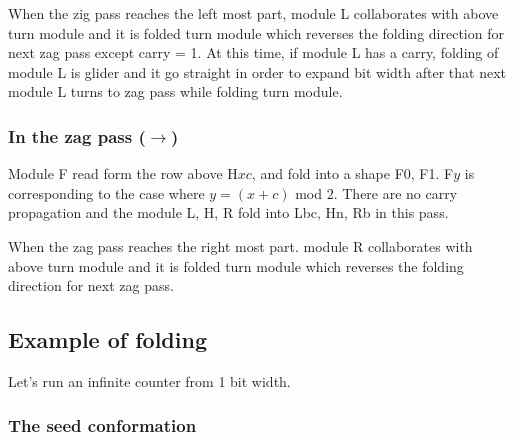 \documentclass[runningheads]{llncs}
\begin{document}
When the zig pass reaches the left most part, module L collaborates with above turn module and it is folded turn module which reverses the folding direction for next zag pass except carry = 1.
At this time, if module L has a carry, folding of module L is glider and it go straight in order to expand bit width after that next module L turns to zag pass while folding turn module.

\subsubsection{In the zag pass ($\rightarrow$)}
Module F read form the row above H$xc$, and fold into a shape F0, F1.
F$y$ is corresponding to the case where $y = (x + c)$ mod $2$.
There are no carry propagation and the module L, H, R fold into Lbc, Hn, Rb in this pass.

When the zag pass reaches the right most part. module R collaborates with above turn module and it is folded turn module which reverses the folding direction for next zag pass.

\subsection{Example of folding}
Let's run an infinite counter from 1 bit width.

\subsubsection{The seed conformation}




  
\end{document}
